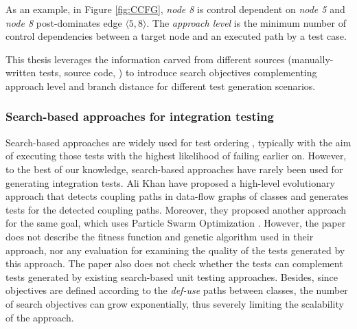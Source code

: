 %
As an example, in Figure \ref{fig:CCFG}, \textit{node 8} is control dependent on \textit{node 5} and \textit{node 8} post-dominates edge $\langle 5,8\rangle$. %
The \textit{approach level} is the minimum number of control dependencies between a target node and an executed path by a test case. 

This thesis leverages the information carved from different sources (\eg manually-written tests, source code, \etc) to introduce search objectives complementing approach level and branch distance for different test generation scenarios. 

\subsubsection{Search-based approaches for integration testing}

Search-based approaches are widely used for test ordering \cite{Wang2010, Steindl2012, Hashim2005, Vergilio2012, Bansal2009, JIiang2019, Borner2009, Mariani2016, Guizzo2015, Abdurazik2009, DaVeigaCabral2010, Briand2003a, Vergilio2012}, typically with the aim of executing those tests with the highest likelihood of failing earlier on. %
However, to the best of our knowledge, search-based approaches have rarely been used for generating integration tests. Ali Khan \etal \cite{AliKhan2013} have proposed a high-level evolutionary approach that detects coupling paths in data-flow graphs of classes and generates tests for the detected coupling paths. Moreover, they proposed another approach for the same goal, which uses Particle Swarm Optimization \cite{Khan2014}. However, the paper does not describe the fitness function and genetic algorithm used in their approach, nor any evaluation for examining the quality of the tests generated by this approach. 
The paper also does not check whether the tests can complement tests generated by existing search-based unit testing approaches. Besides, since objectives are defined according to the \textit{def-use} paths between classes, the number of search objectives can grow exponentially, thus severely limiting the scalability of the approach.

